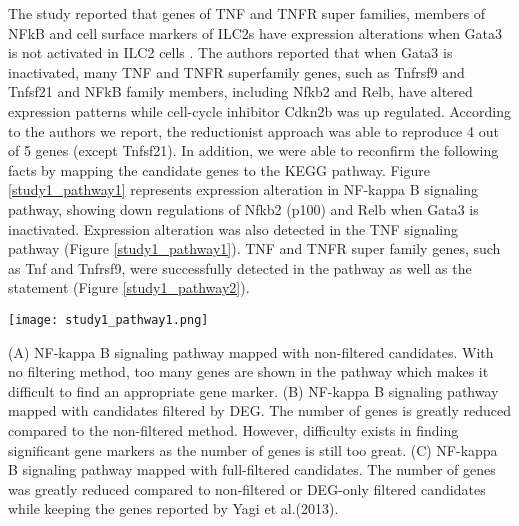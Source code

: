 \documentclass[oneside,phd]{snuthesis}
\begin{document}
The study reported that genes of TNF and TNFR super families, members of NFkB and cell surface markers of ILC2s have expression alterations when Gata3 is not activated in ILC2 cells \citep{yagi2014transcription}. 
The authors reported that when Gata3 is inactivated, many TNF and TNFR superfamily genes, such as Tnfrsf9 and Tnfsf21 and NFkB family members, including Nfkb2 and Relb, have altered expression patterns while cell-cycle inhibitor Cdkn2b was up regulated.
According to the authors we report, the reductionist approach was able to reproduce 4 out of 5 genes (except Tnfsf21).
In addition, we were able to reconfirm the following facts by mapping the candidate genes to the KEGG pathway. 
Figure \ref{study1_pathway1} represents expression alteration in NF-kappa B signaling pathway, showing down regulations of Nfkb2 (p100) and Relb when Gata3 is inactivated. 
Expression alteration was also detected in the TNF signaling pathway (Figure \ref{study1_pathway1}). 
TNF and TNFR super family genes, such as Tnf and Tnfrsf9, were successfully detected in the pathway as well as the statement (Figure \ref{study1_pathway2}). 

\begin{figure*}
\begin{center}
\texttt{[image: study1\_pathway1.png]}
\end{center}
\caption{Expression alteration in NF-kappa B signaling pathway \citep{hur2015combined}}
\scriptsize{
{(A) NF-kappa B signaling pathway mapped with non-filtered candidates. With no filtering method, too many genes are shown in the pathway which makes it difficult to find an appropriate gene marker.
(B) NF-kappa B signaling pathway mapped with candidates
filtered by DEG. The number of genes is greatly reduced compared to the non-filtered method. However, difficulty exists in finding significant
gene markers as the number of genes is still too great. 
(C) NF-kappa B signaling pathway mapped with full-filtered candidates. The number of
genes was greatly reduced compared to non-filtered or DEG-only filtered candidates while keeping the genes reported by Yagi et al.(2013).}}
\label{study1_pathway1}

\end{figure*}
\end{document}
